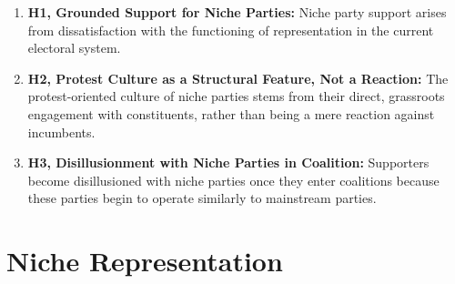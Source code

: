 \begin{enumerate}
	\item \textbf{H1, Grounded Support for Niche Parties:}
	      Niche party support arises from dissatisfaction with the functioning of representation in the current electoral system.

	\item \textbf{H2, Protest Culture as a Structural Feature, Not a Reaction:}
	      The protest-oriented culture of niche parties stems from their direct, grassroots engagement with constituents, rather than being a mere reaction against incumbents.

	\item \textbf{H3, Disillusionment with Niche Parties in Coalition:}
	      Supporters become disillusioned with niche parties once they enter coalitions because these parties begin to operate similarly to mainstream parties.
\end{enumerate}
%
%
%
\chapter{Niche Representation}\label{chap:Niche Representation} %


